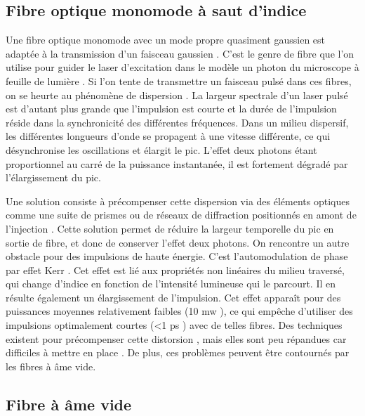 \subsection{Fibre optique monomode à saut d'indice} %

Une fibre optique monomode avec un mode propre quasiment gaussien est adaptée à la transmission d'un faisceau gaussien \cite{ankiewicz_generalized_1992}. C'est le genre de fibre que l'on utilise pour guider le laser d'excitation dans le modèle un photon du microscope à feuille de lumière \cite{migault_whole-brain_2018}. Si l'on tente de transmettre un faisceau pulsé dans ces fibres, on se heurte au phénomène de dispersion \cite{gloge_dispersion_1971} \cite{jurgensen_gaussian_1978}. La largeur spectrale d'un laser pulsé est d'autant plus grande que l'impulsion est courte et la durée de l'impulsion réside dans la synchronicité des différentes fréquences. Dans un milieu dispersif, les différentes longueurs d'onde se propagent à une vitesse différente, ce qui désynchronise les oscillations et élargit le pic. L'effet deux photons étant proportionnel au carré de la puissance instantanée, il est fortement dégradé par l'élargissement du pic. %

Une solution consiste à précompenser cette dispersion via des éléments optiques comme une suite de prismes ou de réseaux de diffraction positionnés en amont de l'injection \cite{fork_negative_1984}. Cette solution permet de réduire la largeur temporelle du pic en sortie de fibre, et donc de conserver l'effet deux photons. On rencontre un autre obstacle pour des impulsions de haute énergie. C'est l'automodulation de phase par effet Kerr \cite{agrawal_nonlinear_2000}. Cet effet est lié aux propriétés non linéaires du milieu traversé, qui change d'indice en fonction de l'intensité lumineuse qui le parcourt. Il en résulte également un élargissement de l'impulsion. Cet effet apparaît pour des puissances moyennes relativement faibles (10 mw \cite{helmchen_miniaturization_2013}), ce qui empêche d'utiliser des impulsions optimalement courtes (<1 ps \cite{helmchen_miniaturization_2013}) avec de telles fibres. Des techniques existent pour précompenser cette distorsion \cite{clark_fiber_2001} \cite{lefort_sub-30-fs_2014}, mais elles sont peu répandues car difficiles à mettre en place \cite{helmchen_miniaturization_2013}. De plus, ces problèmes peuvent être contournés par les fibres à âme vide.

\subsection{Fibre à âme vide}


